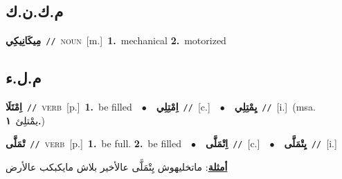 \documentclass[10pt,a4paper,twoside]{article} %
\begin{document}
\begin{multicols}{2}
\vspace{-3mm}
\subsection*{\color{blue}\foreignlanguage{arabic}{م.ك.ن.ك}\color{blue}{ (ntws)}} 

{\setlength\topsep{0pt}\textbf{\foreignlanguage{arabic}{مِيكَانِيكِي}}\ {\color{gray}\texttt{//}\color{black}}\ \textsc{noun}\ [m.]\ \textbf{1.}~mechanical  \textbf{2.}~motorized\ } \vspace{2mm}

\vspace{-3mm}
\subsection*{\color{blue}\foreignlanguage{arabic}{م.ل.ء}\color{blue}{}} 

{\setlength\topsep{0pt}\textbf{\foreignlanguage{arabic}{اِمْتَلَا}}\ {\color{gray}\texttt{//}\color{black}}\ \textsc{verb}\ [p.]\ \textbf{1.}~be filled\ \ $\bullet$\ \ \setlength\topsep{0pt}\textbf{\foreignlanguage{arabic}{اِمْتِلِي}}\ {\color{gray}\texttt{//}\color{black}}\ [c.]\ \ $\bullet$\ \ \setlength\topsep{0pt}\textbf{\foreignlanguage{arabic}{يِمْتِلِي}}\ {\color{gray}\texttt{//}\color{black}}\ [i.]\ \color{gray}(msa. \foreignlanguage{arabic}{يمْتلِئ}~\foreignlanguage{arabic}{\textbf{١.}})\color{black}\ } \vspace{2mm}

{\setlength\topsep{0pt}\textbf{\foreignlanguage{arabic}{تْمَلَّى}}\ {\color{gray}\texttt{//}\color{black}}\ \textsc{verb}\ [p.]\ \textbf{1.}~be full.  \textbf{2.}~be filled\ \ $\bullet$\ \ \setlength\topsep{0pt}\textbf{\foreignlanguage{arabic}{اِتْمَلَّى}}\ {\color{gray}\texttt{//}\color{black}}\ [c.]\ \ $\bullet$\ \ \setlength\topsep{0pt}\textbf{\foreignlanguage{arabic}{يِتْمَلَّى}}\ {\color{gray}\texttt{//}\color{black}}\ [i.]\  \begin{flushright}\color{gray}\foreignlanguage{arabic}{\textbf{\underline{\foreignlanguage{arabic}{أمثلة}}}: ماتخليهوش يِتْمَلَّى عالأخير بلاش مايكبكب عالأرض}\end{flushright}\color{black}} \vspace{2mm}


\end{multicols}
\end{document}
